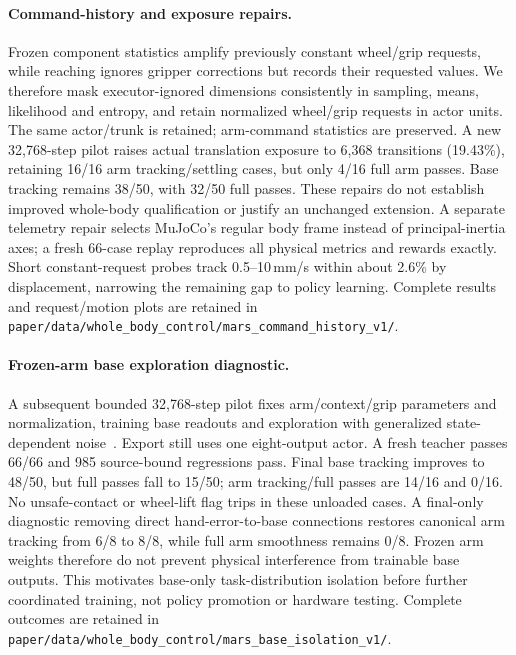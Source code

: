 \paragraph{Command-history and exposure repairs.}
Frozen component statistics amplify previously constant wheel/grip requests,
while reaching ignores gripper corrections but records their requested values.
We therefore mask executor-ignored dimensions consistently in sampling, means,
likelihood and entropy, and retain normalized wheel/grip requests in actor units.
The same actor/trunk is retained; arm-command statistics are preserved. A new
32,768-step pilot raises actual translation exposure to 6,368 transitions
(19.43\%), retaining 16/16 arm tracking/settling cases, but only 4/16 full arm
passes. Base tracking remains 38/50, with 32/50 full passes. These repairs do
not establish improved whole-body qualification or justify an unchanged
extension. A separate telemetry repair selects MuJoCo's regular body frame
instead of principal-inertia axes; a fresh 66-case replay reproduces all
physical metrics and rewards exactly. Short constant-request probes track
0.5--10\,mm/s within about 2.6\% by displacement, narrowing the remaining gap to
policy learning. Complete results and request/motion plots are retained in
\texttt{paper/data/whole\_body\_control/mars\_command\_history\_v1/}.

\paragraph{Frozen-arm base exploration diagnostic.}
A subsequent bounded 32,768-step pilot fixes arm/context/grip parameters and
normalization, training base readouts and exploration with generalized
state-dependent noise~\cite{raffin2022smoothexploration}. Export still uses one
eight-output actor. A fresh teacher passes 66/66 and 985 source-bound regressions
pass. Final base tracking improves to 48/50, but full passes fall to 15/50;
arm tracking/full passes are 14/16 and 0/16. No unsafe-contact or wheel-lift flag
trips in these unloaded cases. A final-only diagnostic removing direct
hand-error-to-base connections restores canonical arm tracking from 6/8 to 8/8,
while full arm smoothness remains 0/8. Frozen arm weights therefore do not
prevent physical interference from trainable base outputs. This motivates
base-only task-distribution isolation before further coordinated training,
not policy promotion or hardware testing. Complete outcomes are retained in
\texttt{paper/data/whole\_body\_control/mars\_base\_isolation\_v1/}.

